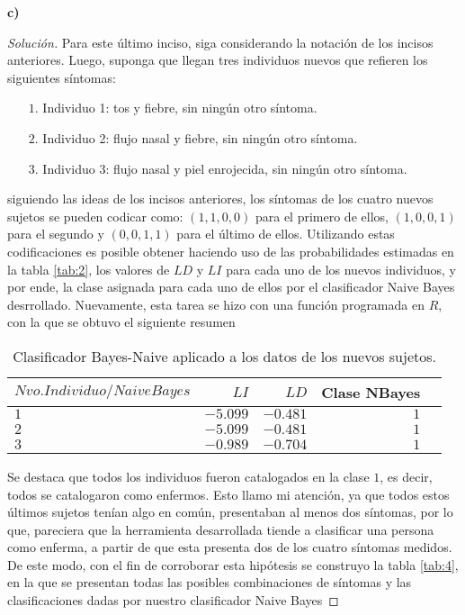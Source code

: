 \documentclass[10.5pt,notitlepage]{article}
\newenvironment{solucion}
  {\begin{proof}[Solución]}
  {\end{proof}}
\theoremstyle{plain}
\begin{document}
\textbf{c)}
\begin{solucion}
Para este último inciso, siga considerando la notación de los incisos anteriores. Luego, suponga que llegan tres individuos nuevos que refieren los siguientes síntomas: 
\begin{itemize}
    \item[\(1.\)] Individuo 1: tos y fiebre, sin ningún otro síntoma. 
    \item[\(2.\)] Individuo 2: flujo nasal  y fiebre, sin ningún otro síntoma.
    \item[\(3.\)] Individuo 3: flujo nasal y piel enrojecida, sin ningún otro síntoma.
\end{itemize}
siguiendo las ideas de los incisos anteriores, los síntomas de los cuatro nuevos sujetos se pueden codicar como: \((1,1,0,0)\) para el primero de ellos, \((1,0,0,1)\) para el segundo y \((0,0,1,1)\) para el último de ellos. Utilizando estas codificaciones es posible obtener haciendo uso de las probabilidades estimadas en la tabla \ref{tab:2}, los valores de \(LD\) y \(LI\) para cada uno de los nuevos individuos, y por ende, la clase asignada para cada uno de ellos por el clasificador Naive Bayes desrrollado. Nuevamente, esta tarea se hizo con una función programada en \(R\), con la que se obtuvo el siguiente resumen
\begin{table}[H]
        \centering
        \begin{tabular}{@{}l@{\hskip 0.3in}|r@{\hskip 0.3in}r@{\hskip 0.3in}r@{\hskip 0.3in}r@{}}
            \toprule
            \(Nvo. Individuo/NaiveBayes\) & \(LI\) & \(LD\)& Clase NBayes\\ 
            \midrule
            \(1\) &\(-5.099\) & \(-0.481\)& \(1\)\\
            \(2\) &\(-5.099\)&\(-0.481\)&\(1\)\\
            \(3\) &\(-0.989\) & \(-0.704\)& \(1\)\\
            \bottomrule
        \end{tabular}
        \caption{Clasificador Bayes-Naive aplicado a los datos de los nuevos sujetos.}
        \label{tab:3}
\end{table}
Se destaca que todos los individuos fueron catalogados en la clase \(1\), es decir, todos se catalogaron como enfermos. Esto llamo mi atención, ya que todos estos últimos sujetos tenían algo en común, presentaban al menos dos síntomas, por lo que, pareciera que la herramienta desarrollada tiende a clasificar una persona como enferma, a partir de que esta presenta dos de los cuatro síntomas medidos. De este modo, con el fin de corroborar esta hipótesis se construyo la tabla \ref{tab:4}, en la que se presentan todas las posibles combinaciones de síntomas y las clasificaciones dadas por nuestro clasificador Naive Bayes

\end{solucion}
\end{document}
